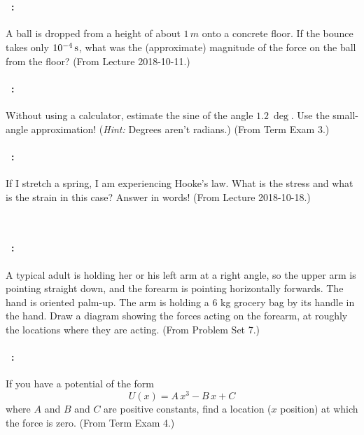 \documentclass[12pt]{article} 
\begin{document}
\vfill
~
\clearpage

\paragraph{\problemname~\theproblem:}%
A ball is dropped from a height of about $1\,m$ onto a concrete
floor. If the bounce takes only $10^{-4}\,\mathrm{s}$, what was the (approximate)
magnitude of the force on the ball from the floor?
(From Lecture 2018-10-11.)

\vfill

\paragraph{\problemname~\theproblem:}%
Without using a calculator, estimate the sine of the angle $1.2~\deg$.
Use the small-angle approximation! (\emph{Hint:} Degrees aren't radians.)
(From Term Exam 3.)

\vfill

\paragraph{\problemname~\theproblem:}%
If I stretch a spring, I am experiencing Hooke's law. What is the
stress and what is the strain in this case? Answer in words!
(From Lecture 2018-10-18.)

\vfill
~
\clearpage

\paragraph{\problemname~\theproblem:}%
A typical adult is holding her or his left arm at a right angle, so
the upper arm is pointing straight down, and the forearm is pointing
horizontally forwards. The hand is oriented palm-up. The arm is
holding a 6 kg grocery bag by its handle in the hand. Draw a diagram
showing the forces acting on the forearm, at roughly the locations
where they are acting.
(From Problem Set 7.)

\vfill

\paragraph{\problemname~\theproblem:}%
If you have a potential of the form
$$
U(x) = A\,x^3 - B\,x + C
$$ where $A$ and $B$ and $C$ are positive constants, find a location ($x$ position) at which
the force is zero.
(From Term Exam 4.)
\end{document}
